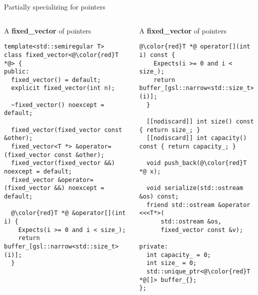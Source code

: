 \begin{frame}[t,fragile,shrink=20]{Partially specializing for pointers}

\begin{columns}[T]

\begin{block}{A \textbf{fixed\_vector} of pointers}
\begin{lstlisting}[escapechar=@]
template<std::semiregular T>
class fixed_vector<@\color{red}T *@> {
public:
  fixed_vector() = default;
  explicit fixed_vector(int n);

  ~fixed_vector() noexcept = default;

  fixed_vector(fixed_vector const &other);
  fixed_vector<T *> &operator=(fixed_vector const &other);
  fixed_vector(fixed_vector &&) noexcept = default;
  fixed_vector &operator=(fixed_vector &&) noexcept = default;

  @\color{red}T *@ &operator[](int i) {
    Expects(i >= 0 and i < size_);
    return buffer_[gsl::narrow<std::size_t>(i)];
  }
\end{lstlisting}
\end{block}

\begin{block}{A \textbf{fixed\_vector} of pointers}
\begin{lstlisting}[escapechar=@]
  @\color{red}T *@ operator[](int i) const {
    Expects(i >= 0 and i < size_);
    return buffer_[gsl::narrow<std::size_t>(i)];
  }

  [[nodiscard]] int size() const { return size_; }
  [[nodiscard]] int capacity() const { return capacity_; }

  void push_back(@\color{red}T *@ x);

  void serialize(std::ostream &os) const;
  friend std::ostream &operator <<<T*>(
      std::ostream &os, 
      fixed_vector const &v);

private:
  int capacity_ = 0;
  int size_ = 0;
  std::unique_ptr<@\color{red}T *@[]> buffer_{};
};
\end{lstlisting}
\end{block}

\end{columns}
\end{frame}

